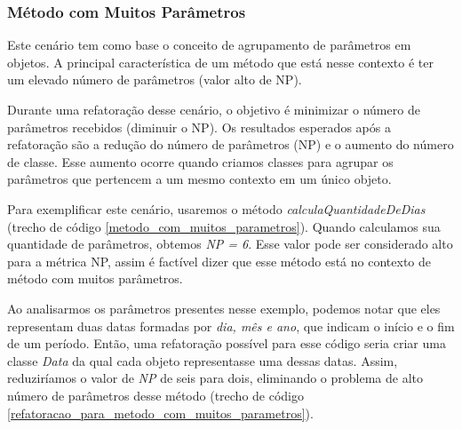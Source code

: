 \subsubsection{Método com Muitos Parâmetros}
                                                                         
Este cenário tem como base o conceito de agrupamento de parâmetros em objetos. A principal característica de um método que está nesse contexto é ter um elevado número de parâmetros (valor alto de NP).
                                                         
Durante uma refatoração desse cenário, o objetivo é minimizar o número de parâmetros recebidos (diminuir o NP). Os resultados esperados após a refatoração são a redução do número de parâmetros (NP) e o aumento do número de classe. Esse aumento ocorre quando criamos classes para agrupar os parâmetros que pertencem a um mesmo contexto em um único objeto.
	                                               
Para exemplificar este cenário, usaremos o método \textit{calculaQuantidadeDeDias} (trecho de código \ref{metodo_com_muitos_parametros}). Quando calculamos sua quantidade de parâmetros, obtemos \textit{NP = 6}. Esse valor pode ser considerado alto para a métrica NP, assim é factível dizer que esse método está no contexto de método com muitos parâmetros.                    	

                   
                                                                                                        
Ao analisarmos os parâmetros presentes nesse exemplo, podemos notar que eles representam duas datas formadas por \textit{dia, mês e ano}, que indicam o início e o fim de um período. Então, uma refatoração possível para esse código seria criar uma classe \textit{Data} da qual cada objeto representasse uma dessas datas. Assim, reduziríamos o valor de \textit{NP} de seis para dois, eliminando o problema de alto número de parâmetros desse método (trecho de código \ref{refatoracao_para_metodo_com_muitos_parametros}). 
                                                                               
          
              

